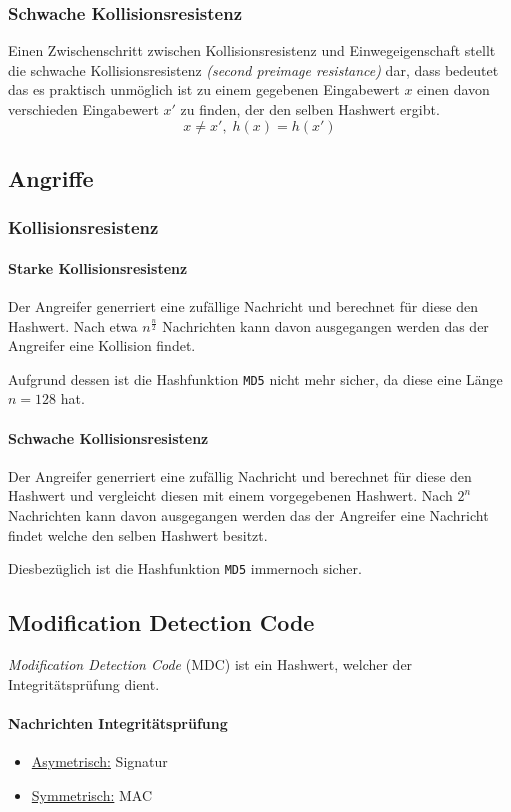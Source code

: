 \documentclass[a4paper,landscape]{article}
\begin{document}
\begin{multicols*}{4}
	\subsubsection{Schwache Kollisionsresistenz}
	Einen Zwischenschritt zwischen Kollisionsresistenz und Einwegeigenschaft
	stellt die schwache Kollisionsresistenz \emph{(second preimage resistance)}
	dar, dass bedeutet das es praktisch unmöglich ist zu einem gegebenen
	Eingabewert \(x\) einen davon verschieden Eingabewert \(x'\) zu finden, der
	den selben Hashwert ergibt. \[x \neq x',\; h(x) = h(x')\]

	\subsection{Angriffe}
	\subsubsection*{Kollisionsresistenz}
	\paragraph{Starke Kollisionsresistenz}
	Der Angreifer generriert eine zufällige Nachricht und berechnet für diese
	den Hashwert. Nach etwa \(n^{\frac{n}{2}}\) Nachrichten kann davon
	ausgegangen werden das der Angreifer eine Kollision findet. \par
	Aufgrund dessen ist die Hashfunktion \texttt{MD5} nicht mehr sicher, da
	diese eine Länge \(n = 128\) hat.
	\paragraph{Schwache Kollisionsresistenz}
	Der Angreifer generriert eine zufällig Nachricht und berechnet für diese
	den Hashwert und vergleicht diesen mit einem vorgegebenen Hashwert. Nach
	\(2^{n}\) Nachrichten kann davon ausgegangen werden das der Angreifer eine
	Nachricht findet welche den selben Hashwert besitzt. \par
	Diesbezüglich ist die Hashfunktion \texttt{MD5} immernoch sicher.

	\subsection{Modification Detection Code}
	\emph{Modification Detection Code} (MDC) ist ein Hashwert, welcher der
	Integritätsprüfung dient.
	\paragraph{Nachrichten Integritätsprüfung}
	\begin{itemize}[nolistsep]
		\item \underline{Asymetrisch:} Signatur
		\item \underline{Symmetrisch:} MAC
	\end{itemize}


\end{multicols*}
\end{document}
